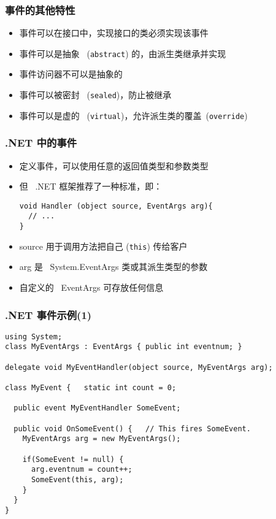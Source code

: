 \begin{frame}[fragile]
\frametitle{事件的其他特性}
\setlength{\itemsep}{6pt plus 1pt}
\begin{itemize}
\item 事件可以在接口中，实现接口的类必须实现该事件
\item 事件可以是抽象~ (\texttt{abstract}) 的，由派生类继承并实现
\item 事件访问器不可以是抽象的
\item 事件可以被密封~ (\texttt{sealed})，防止被继承
\item 事件可以是虚的~ (\texttt{virtual})，允许派生类的覆盖~(\texttt{override})
\end{itemize}
\end{frame}

\begin{frame}[fragile]
\frametitle{.NET 中的事件}
\begin{itemize}
\item 定义事件，可以使用任意的返回值类型和参数类型
\item 但 ~.NET 框架推荐了一种标准，即：
\begin{lstlisting}
void Handler (object source, EventArgs arg){
  // ...
}
\end{lstlisting}
\end{itemize}
\medskip
\begin{itemize}
\item source 用于调用方法把自己 (\texttt{this}) 传给客户
\item arg 是 ~System.EventArgs 类或其派生类型的参数
\item 自定义的 ~EventArgs 可存放任何信息
\end{itemize}

\end{frame}

\begin{frame}[fragile]
\frametitle{.NET 事件示例(1)}
\begin{lstlisting}
using System;
class MyEventArgs : EventArgs { public int eventnum; }

delegate void MyEventHandler(object source, MyEventArgs arg);

class MyEvent {   static int count = 0;

  public event MyEventHandler SomeEvent;

  public void OnSomeEvent() {   // This fires SomeEvent.
    MyEventArgs arg = new MyEventArgs();

    if(SomeEvent != null) {
      arg.eventnum = count++;
      SomeEvent(this, arg);
    }
  }
}
\end{lstlisting}
\end{frame}

